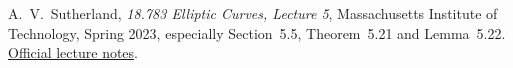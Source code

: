 A.~V.~Sutherland, \emph{18.783 Elliptic Curves, Lecture 5},
Massachusetts Institute of Technology, Spring 2023,
especially Section~5.5, Theorem~5.21 and Lemma~5.22.
\href{https://math.mit.edu/classes/18.783/2023/LectureNotes5.pdf}{Official lecture notes}.
